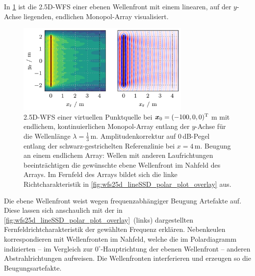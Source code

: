In \Abb\ref{fig:wfs25d_lineSSD_truncation} ist die 2.5D-WFS einer ebenen
Wellenfront mit einem linearen, auf der $y$-Achse liegenden, endlichen
Monopol-Array visualisiert.
%
\begin{figure}[t]
\centering
\begin{plotfigures}
\includegraphics[width=85mm]{../python/wfs25d_lineSSD_truncation.png}
\end{plotfigures}
\caption{2.5D-WFS einer virtuellen Punktquelle bei
$\bm{x}_\mathrm{0} = (-100,0,0)^\mathrm{T}$\,m mit endlichem, kontinuierlichen Monopol-Array
entlang der $y$-Achse für die Wellenlänge $\lambda=\frac{1}{3}$\,m.
%
Amplitudenkorrektur auf $0$\,dB-Pegel entlang der schwarz-gestrichelten
Referenzlinie bei $x=4$\,m.
%
%
Beugung an einem endlichem Array:
Wellen mit anderen Laufrichtungen beeinträchtigen die
gewünschte ebene Wellenfront im Nahfeld des Arrays. Im Fernfeld des Arrays
bildet sich die linke Richtcharakteristik in
\Abb\ref{fig:wfs25d_lineSSD_polar_plot_overlay} aus.
%
\cc
}
\label{fig:wfs25d_lineSSD_truncation}
\end{figure}
%
Die ebene Wellenfront weist wegen frequenzabhängiger Beugung Artefakte auf.
%
Diese lassen sich anschaulich mit der in
\Abb\ref{fig:wfs25d_lineSSD_polar_plot_overlay}~(links)
dargestellten Fernfeldrichtcharakteristik der gewählten Frequenz erklären.
%
Nebenkeulen korrespondieren mit Wellenfronten im Nahfeld, welche die im
Polardiagramm indizierten -- im Vergleich zur $0^\circ$-Hauptrichtung der ebenen
Wellenfront -- anderen Abstrahlrichtungen  aufweisen.
%
Die Wellenfronten interferieren und erzeugen so die Beugungsartefakte.
%
